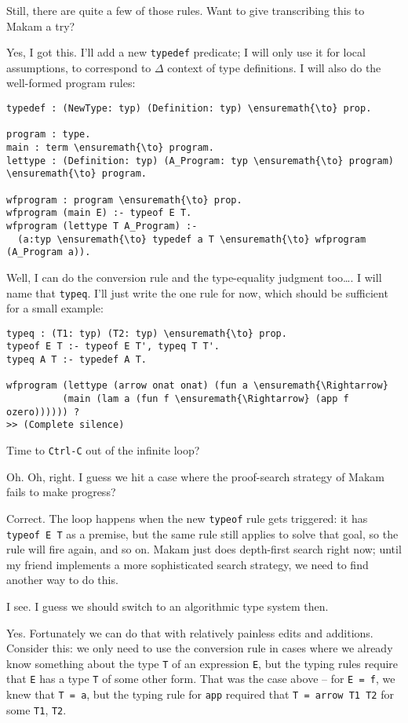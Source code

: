 \heroADVISOR{} Still, there are quite a few of those rules. Want to give
transcribing this to Makam a try?

\heroSTUDENT{} Yes, I got this. I'll add a new \texttt{typedef} predicate; I
will only use it for local assumptions, to correspond to \(\Delta\)
context of type definitions. I will also do the well-formed program
rules:

\begin{verbatim}
typedef : (NewType: typ) (Definition: typ) \ensuremath{\to} prop.

program : type. 
main : term \ensuremath{\to} program. 
lettype : (Definition: typ) (A_Program: typ \ensuremath{\to} program) \ensuremath{\to} program.

wfprogram : program \ensuremath{\to} prop.
wfprogram (main E) :- typeof E T.
wfprogram (lettype T A_Program) :-
  (a:typ \ensuremath{\to} typedef a T \ensuremath{\to} wfprogram (A_Program a)).
\end{verbatim}

Well, I can do the conversion rule and the type-equality judgment
too\ldots{}. I will name that \texttt{typeq}. I'll just write the one
rule for now, which should be sufficient for a small example:

\begin{verbatim}
typeq : (T1: typ) (T2: typ) \ensuremath{\to} prop.
typeof E T :- typeof E T', typeq T T'.
typeq A T :- typedef A T.

wfprogram (lettype (arrow onat onat) (fun a \ensuremath{\Rightarrow}
          (main (lam a (fun f \ensuremath{\Rightarrow} (app f ozero)))))) ?
>> (Complete silence)
\end{verbatim}

\heroADVISOR{} Time to \texttt{Ctrl-C} out of the infinite loop?

\heroSTUDENT{} Oh. Oh, right. I guess we hit a case where the proof-search
strategy of Makam fails to make progress?

\heroADVISOR{} Correct. The loop happens when the new \texttt{typeof} rule
gets triggered: it has \texttt{typeof\ E\ T\textquotesingle{}} as a
premise, but the same rule still applies to solve that goal, so the rule
will fire again, and so on. Makam just does depth-first search right
now; until my friend implements a more sophisticated search strategy, we
need to find another way to do this.

\heroSTUDENT{} I see. I guess we should switch to an algorithmic type system
then.

\heroADVISOR{} Yes. Fortunately we can do that with relatively painless edits
and additions. Consider this: we only need to use the conversion rule in
cases where we already know something about the type \texttt{T} of an
expression \texttt{E}, but the typing rules require that \texttt{E} has
a type \texttt{T\textquotesingle{}} of some other form. That was the
case above -- for \texttt{E\ =\ f}, we knew that \texttt{T\ =\ a}, but
the typing rule for \texttt{app} required that
\texttt{T\textquotesingle{}\ =\ arrow\ T1\ T2} for some \texttt{T1},
\texttt{T2}.

